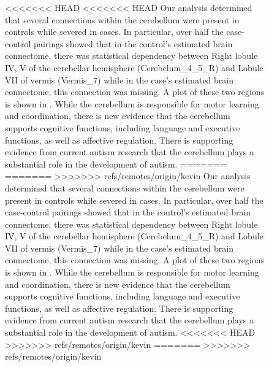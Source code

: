 \documentclass{nature}
\begin{document}
{\begin{figure}[tb]
<<<<<<< HEAD
<<<<<<< HEAD
Our analysis determined that several connections within the cerebellum were present
in controls while severed in cases. In particular, over half the case-control
pairings showed that in the control's estimated brain connectome, 
there was statistical dependency between Right lobule IV, V of the cerebellar
hemisphere (Cerebelum\_4\_5\_R) and Lobule VII of vermis (Vermis\_7) while in the
case's estimated brain connectome, this connection was missing. A plot
of these two regions is shown in . While the cerebellum
is responsible for motor learning and coordination, there is new evidence that
the cerebellum supports cognitive functions, including language and executive functions,
as well as affective regulation\cite{goines2011autoantibodies,braunschweig2012maternal}.
There is supporting evidence from current autism research that the cerebellum plays
a substantial role in the development of autism\cite{d2015cerebellar,becker2013autism,wang2014cerebellum}.
=======
=======
>>>>>>> refs/remotes/origin/kevin
Our analysis determined that several connections within the cerebellum were
present
in controls while severed in cases. In particular, over half the case-control
pairings showed that in the control's estimated brain connectome, 
there was statistical dependency between Right lobule IV, V of the cerebellar
hemisphere (Cerebelum\_4\_5\_R) and Lobule VII of vermis (Vermis\_7) while in
the
case's estimated brain connectome, this connection was missing. A plot
of these two regions is shown in . While the cerebellum
is responsible for motor learning and coordination, there is new evidence that
the cerebellum supports cognitive functions, including language and executive
functions,
as well as affective
regulation\cite{goines2011autoantibodies,braunschweig2012maternal}.
There is supporting evidence from current autism research that the cerebellum
plays
a substantial role in the development of
autism\cite{d2015cerebellar,becker2013autism,wang2014cerebellum}.
<<<<<<< HEAD
>>>>>>> refs/remotes/origin/kevin
=======
>>>>>>> refs/remotes/origin/kevin


\end{figure}}
\end{document}
